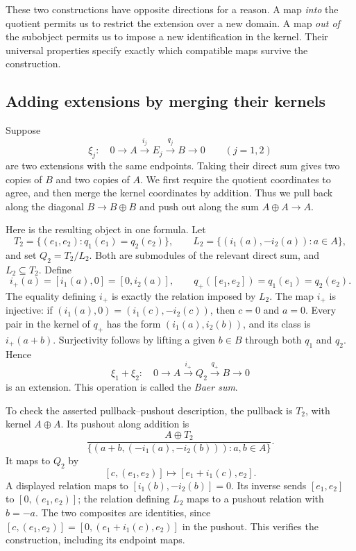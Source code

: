 These two constructions have opposite directions for a reason. A map
\emph{into} the quotient permits us to restrict the extension over a new
domain. A map \emph{out of} the subobject permits us to impose a new
identification in the kernel. Their universal properties specify exactly
which compatible maps survive the construction.

\subsection{Adding extensions by merging their kernels}

Suppose
\[
\xi_j:\quad 0\longrightarrow A\xrightarrow{i_j}E_j
 \xrightarrow{q_j}B\longrightarrow0
\qquad (j=1,2)
\]
are two extensions with the same endpoints. Taking their direct sum gives
two copies of $B$ and two copies of $A$. We first require the quotient
coordinates to agree, and then merge the kernel coordinates by addition.
Thus we pull back along the diagonal $B\to B\oplus B$ and push out along
the sum $A\oplus A\to A$.

Here is the resulting object in one formula. Let
\[
T_2=\{(e_1,e_2):q_1(e_1)=q_2(e_2)\},\qquad
L_2=\{(i_1(a),-i_2(a)):a\in A\},
\]
and set $Q_2=T_2/L_2$. Both are submodules of the relevant direct sum,
and $L_2\subseteq T_2$. Define
\[
i_+(a)=[i_1(a),0]=[0,i_2(a)],\qquad
q_+([e_1,e_2])=q_1(e_1)=q_2(e_2).
\]
The equality defining $i_+$ is exactly the relation imposed by $L_2$.
The map $i_+$ is injective: if $(i_1(a),0)=(i_1(c),-i_2(c))$, then
$c=0$ and $a=0$. Every pair in the kernel of $q_+$ has the form
$(i_1(a),i_2(b))$, and its class is $i_+(a+b)$. Surjectivity follows by
lifting a given $b\in B$ through both $q_1$ and $q_2$. Hence
\[
\xi_1+\xi_2:\quad
0\longrightarrow A\xrightarrow{i_+}Q_2\xrightarrow{q_+}B
\longrightarrow0
\]
is an extension. This operation is called the \emph{Baer sum}.

To check the asserted pullback--pushout description, the pullback is
$T_2$, with kernel $A\oplus A$. Its pushout along addition is
\[
\frac{A\oplus T_2}
 {\{(a+b,(-i_1(a),-i_2(b))):a,b\in A\}}.
\]
It maps to $Q_2$ by
\[
[c,(e_1,e_2)]\longmapsto[e_1+i_1(c),e_2].
\]
A displayed relation maps to $[i_1(b),-i_2(b)]=0$. Its inverse sends
$[e_1,e_2]$ to $[0,(e_1,e_2)]$; the relation defining $L_2$ maps to a
pushout relation with $b=-a$. The two composites are identities, since
$[c,(e_1,e_2)]=[0,(e_1+i_1(c),e_2)]$ in the pushout. This verifies the
construction, including its endpoint maps.

